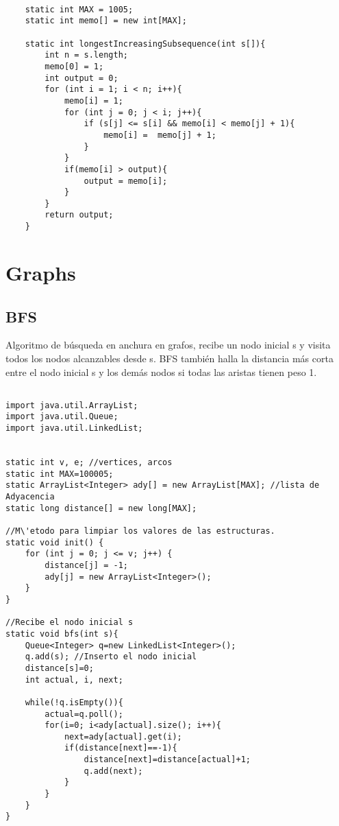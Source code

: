 \documentclass[11pt,letterpaper,twocolumn,twosided]{article}
\begin{document}
\begin{lstlisting}

	static int MAX = 1005;
	static int memo[] = new int[MAX];
	
	static int longestIncreasingSubsequence(int s[]){
		int n = s.length;
		memo[0] = 1;
		int output = 0;
		for (int i = 1; i < n; i++){
			memo[i] = 1;
			for (int j = 0; j < i; j++){
				if (s[j] <= s[i] && memo[i] < memo[j] + 1){
					memo[i] =  memo[j] + 1;
				} 
			}
			if(memo[i] > output){
				output = memo[i];
			}
		}
		return output;
	}
\end{lstlisting}

\section{Graphs}

\subsection{BFS}
Algoritmo de b\'usqueda en anchura en grafos, recibe un nodo inicial s y visita todos los nodos alcanzables desde s. BFS tambi\'en halla la distancia m\'as corta entre el nodo inicial s y los dem\'as nodos si todas las aristas tienen peso 1.

\begin{lstlisting}

import java.util.ArrayList;
import java.util.Queue;
import java.util.LinkedList;


static int v, e; //vertices, arcos
static int MAX=100005; 
static ArrayList<Integer> ady[] = new ArrayList[MAX]; //lista de Adyacencia
static long distance[] = new long[MAX];

//M\'etodo para limpiar los valores de las estructuras.
static void init() {
    for (int j = 0; j <= v; j++) {
        distance[j] = -1;
        ady[j] = new ArrayList<Integer>();
    }
}

//Recibe el nodo inicial s
static void bfs(int s){
    Queue<Integer> q=new LinkedList<Integer>();
    q.add(s); //Inserto el nodo inicial
    distance[s]=0;
    int actual, i, next;
        
    while(!q.isEmpty()){
        actual=q.poll();
        for(i=0; i<ady[actual].size(); i++){
            next=ady[actual].get(i);
            if(distance[next]==-1){
                distance[next]=distance[actual]+1;
                q.add(next);
            }
        }
    }
}\end{lstlisting}
\end{document}
